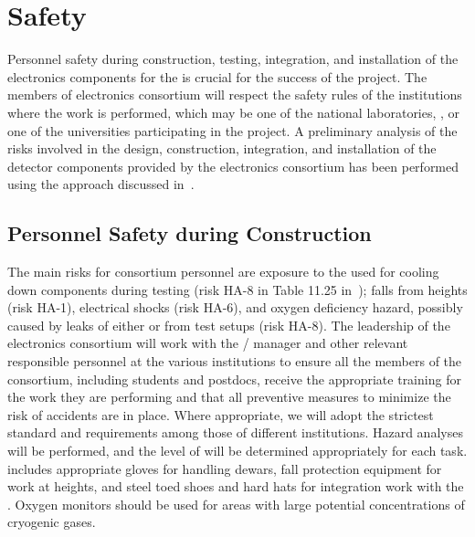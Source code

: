 \section{Safety}
\label{sec:fdsp-tpcelec-safety}

Personnel safety during construction, testing, integration,
and installation of the  electronics components for the 
  is crucial for the success
of the project. The members of  electronics consortium will
respect the safety rules of the institutions where the work is
performed, which may be one of the national laboratories, ,
or one of the universities participating in the project. A
preliminary analysis of the risks involved in the design,
construction, integration, and installation of the detector
components provided by the  electronics consortium has been
performed using the approach discussed in~\tcchesh.


\subsection{Personnel Safety during Construction}
\label{sec:fdsp-tpcelec-safety-personnel}

The main risks for consortium personnel are exposure to
the \lntwo used for cooling down components during testing (risk HA-8
in Table 11.25 in~\tcchappx); falls from heights (risk HA-1), 
electrical shocks (risk HA-6), and oxygen deficiency hazard, possibly 
caused by leaks of either \lntwo or  from test setups (risk HA-8).
The leadership of the
 electronics consortium will work with the /
 manager and other relevant responsible personnel at the
various institutions to ensure all the members of the
consortium, including students and postdocs, receive the appropriate training for the work they
are performing and that all preventive measures to minimize
the risk of accidents are in place. Where appropriate,
we will adopt the strictest standard and requirements among
those of different institutions. Hazard analyses will be performed,
and the level of  will be determined
appropriately for each task.  includes 
appropriate gloves for handling \lntwo dewars, fall
protection equipment for work at heights, and steel toed shoes and
hard hats for integration work with the . Oxygen
monitors should be used for areas with large potential concentrations of
cryogenic gases.

